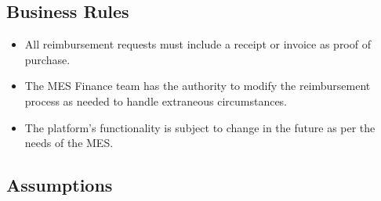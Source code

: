 \documentclass[12pt]{article}
\begin{document}
\subsection{Business Rules}
\begin{itemize}
    \item All reimbursement requests must include a receipt or invoice as proof of purchase.
    \item The MES Finance team has the authority to modify the reimbursement process as needed to handle extraneous circumstances.
    \item The platform’s functionality is subject to change in the future as per the needs of the MES.
\end{itemize}

\subsection{Assumptions}
\end{document}
